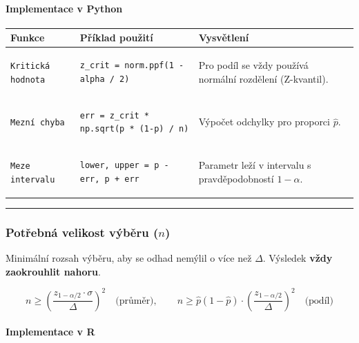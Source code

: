 \documentclass[a4paper, 11pt]{article}
\newenvironment{funkcedict}
{%
  \begingroup
  \renewcommand{\arraystretch}{1.4}%
  \lstset{basicstyle=\ttfamily\small, columns=fullflexible}%
  \setlength{\tabcolsep}{4pt}%
  \begin{tabular}{p{0.19\textwidth} p{0.38\textwidth} p{0.30\textwidth}}
  \textbf{Funkce} & \textbf{Příklad použití} & \textbf{Vysvětlení} \\
  \midrule
}
{%
  \end{tabular}%
  \endgroup
}
\begin{document}
\paragraph{Implementace v Python}\mbox{}\par

\begin{funkcedict}

	\texttt{Kritická hodnota} &
	\begin{lstlisting}
z_crit = norm.ppf(1 - alpha / 2)
	\end{lstlisting}
	& Pro podíl se vždy používá normální rozdělení (Z-kvantil). \\
	\texttt{Mezní chyba} &
	\begin{lstlisting}
err = z_crit * np.sqrt(p * (1-p) / n)
	\end{lstlisting}
	& Výpočet odchylky pro proporci $\hat{p}$. \\
	\texttt{Meze intervalu} &
	\begin{lstlisting}
lower, upper = p - err, p + err
	\end{lstlisting}
	& Parametr leží v intervalu s pravděpodobností $1 - \alpha$. \\

\end{funkcedict}

\noindent\hrule\medskip

\subsubsection{Potřebná velikost výběru ($n$)}

Minimální rozsah výběru, aby se odhad nemýlil o více než $\Delta$.
Výsledek \textbf{vždy zaokrouhlit nahoru}.

\begin{equation*}
	n \ge \left(\frac{z_{1-\alpha/2} \cdot \sigma}{\Delta}\right)^2 \quad \text{(průměr)}, \qquad
	n \ge \hat{p}(1-\hat{p}) \cdot \left(\frac{z_{1-\alpha/2}}{\Delta}\right)^2 \quad \text{(podíl)}
\end{equation*}

\paragraph{Implementace v R}\mbox{}\par
\end{document}
